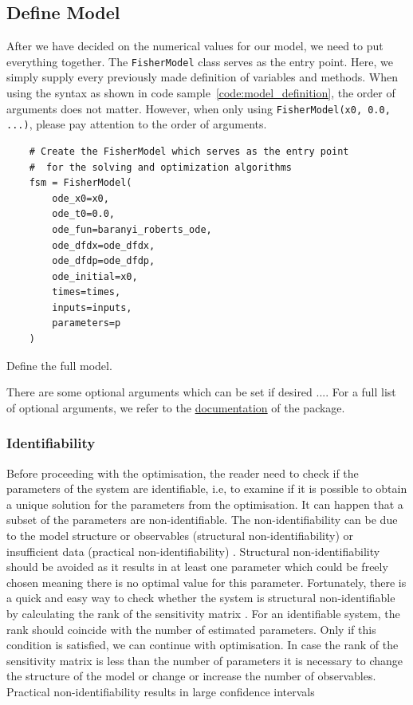 \documentclass[10pt,A4paper]{article}
\begin{document}
\subsection*{Define Model}
After we have decided on the numerical values for our model, we need to put everything together. 
The \texttt{FisherModel} class serves as the entry point. 
Here, we simply supply every previously made definition of variables and methods. 
When using the syntax as shown in code sample~\ref{code:model_definition}, the order of arguments does not matter. 
However, when only using \texttt{FisherModel(x0, 0.0, ...)}, please pay attention to the order of arguments.
\begin{code}[H]
    \begin{verbatim}
    # Create the FisherModel which serves as the entry point
    #  for the solving and optimization algorithms
    fsm = FisherModel(
        ode_x0=x0,
        ode_t0=0.0,
        ode_fun=baranyi_roberts_ode,
        ode_dfdx=ode_dfdx,
        ode_dfdp=ode_dfdp,
        ode_initial=x0,
        times=times,
        inputs=inputs,
        parameters=p
    )
    \end{verbatim}
    \caption{Define the full model.}
    \label{code:model_definition}
\end{code}
There are some optional arguments which can be set if desired ....
For a full list of optional arguments, we refer to the \href{https://spatial-systems-biology-freiburg.github.io/FisInMa/}{documentation} of the package.
%
\subsubsection*{Identifiability}
Before proceeding with the optimisation, the reader need to check if the parameters of the system are identifiable, i.e, to examine if it is possible to obtain a unique solution for the parameters from the optimisation. 
It can happen that a subset of the parameters are non-identifiable. 
The non-identifiability can be due to the model structure or observables (structural non-identifiability) or insufficient data (practical non-identifiability) \cite{}. 
Structural non-identifiability should be avoided as it results in at least one parameter which could be freely chosen meaning there is no optimal value for this parameter. 
Fortunately, there is a quick and easy way to check whether the system is structural non-identifiable by calculating the rank of the sensitivity matrix \cite{}. 
For an identifiable system, the rank should coincide with the number of estimated parameters. 
Only if this condition is satisfied, we can continue with optimisation. 
In case the rank of the sensitivity matrix is less than the number of parameters it is necessary to change the structure of the model or change or increase the number of observables. 
Practical non-identifiability results in large confidence intervals \cite{} \newline
\end{document}
